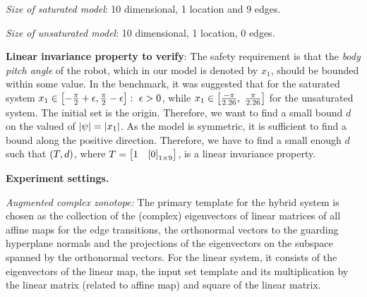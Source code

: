 \emph{Size of saturated model}: 10 dimensional, 1 location and 9 edges.

\emph{Size of unsaturated model}: 10 dimensional, 1 location, 0 edges.

{\bf Linear invariance property to verify}: The safety requirement is
that the \emph{body pitch angle} of the robot, which in our model is
denoted by $x_1$, should be bounded within some value. In the
benchmark, it was suggested that for the saturated system
$x_1\in\left[-\frac{\pi}{2}+\epsilon,\frac{\pi}{2}-\epsilon\right]:~\epsilon>0$,
while $x_1\in\left[\frac{-\pi}{2.26},~\frac{\pi}{2.26}\right]$ for the
unsaturated system. The initial set is the origin.  Therefore, we want
to find a small bound $d$ on the valued of
$\left|\psi\right|=\left|x_1\right|$.  As the model is symmetric, it is
sufficient to find a bound along the positive direction.  Therefore,
we have to find a small enough $d$ such that $\left(T,d\right)$, where
$T=\left[\begin{matrix}1&\left[0\right]_{1\times 9}\end{matrix}\right]$, is a linear invariance property.

{\bf Experiment settings.}

\emph{Augmented complex zonotope: }  The primary template for the hybrid system
is chosen as the collection of the (complex) eigenvectors of linear
matrices of all affine maps for the edge transitions, the orthonormal
vectors to the guarding hyperplane normals and the projections of the
eigenvectors on the subspace spanned by the orthonormal vectors.  For
the linear system, it consists of the eigenvectors of the linear map,
the input set template and its multiplication by the linear matrix
(related to affine map) and square of the linear matrix.

